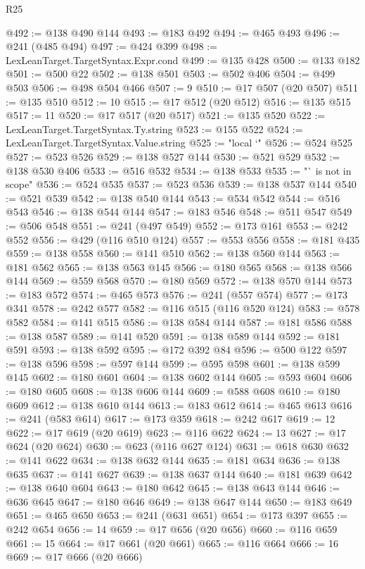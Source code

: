 \begin{lexlean}{R25}
\begin{coremodule}
@492 := @138 @490 @144
@493 := @183 @492
@494 := @465 @493
@496 := @241 (@485 @494)
@497 := @424 @399
@498 := LexLeanTarget.TargetSyntax.Expr.cond
@499 := @135 @428
@500 := @133 @182
@501 := @500 @22
@502 := @138 @501
@503 := @502 @406
@504 := @499 @503
@506 := @498 @504 @466
@507 := 9
@510 := @17 @507 (@20 @507)
@511 := @135 @510
@512 := 10
@515 := @17 @512 (@20 @512)
@516 := @135 @515
@517 := 11
@520 := @17 @517 (@20 @517)
@521 := @135 @520
@522 := LexLeanTarget.TargetSyntax.Ty.string
@523 := @155 @522
@524 := LexLeanTarget.TargetSyntax.Value.string
@525 := "local `"
@526 := @524 @525
@527 := @523 @526
@529 := @138 @527 @144
@530 := @521 @529
@532 := @138 @530 @406
@533 := @516 @532
@534 := @138 @533
@535 := "` is not in scope"
@536 := @524 @535
@537 := @523 @536
@539 := @138 @537 @144
@540 := @521 @539
@542 := @138 @540 @144
@543 := @534 @542
@544 := @516 @543
@546 := @138 @544 @144
@547 := @183 @546
@548 := @511 @547
@549 := @506 @548
@551 := @241 (@497 @549)
@552 := @173 @161
@553 := @242 @552
@556 := @429 (@116 @510 @124)
@557 := @553 @556
@558 := @181 @435
@559 := @138 @558
@560 := @141 @510
@562 := @138 @560 @144
@563 := @181 @562
@565 := @138 @563 @145
@566 := @180 @565
@568 := @138 @566 @144
@569 := @559 @568
@570 := @180 @569
@572 := @138 @570 @144
@573 := @183 @572
@574 := @465 @573
@576 := @241 (@557 @574)
@577 := @173 @341
@578 := @242 @577
@582 := @116 @515 (@116 @520 @124)
@583 := @578 @582
@584 := @141 @515
@586 := @138 @584 @144
@587 := @181 @586
@588 := @138 @587
@589 := @141 @520
@591 := @138 @589 @144
@592 := @181 @591
@593 := @138 @592
@595 := @172 @392 @84
@596 := @500 @122
@597 := @138 @596
@598 := @597 @144
@599 := @595 @598
@601 := @138 @599 @145
@602 := @180 @601
@604 := @138 @602 @144
@605 := @593 @604
@606 := @180 @605
@608 := @138 @606 @144
@609 := @588 @608
@610 := @180 @609
@612 := @138 @610 @144
@613 := @183 @612
@614 := @465 @613
@616 := @241 (@583 @614)
@617 := @173 @359
@618 := @242 @617
@619 := 12
@622 := @17 @619 (@20 @619)
@623 := @116 @622
@624 := 13
@627 := @17 @624 (@20 @624)
@630 := @623 (@116 @627 @124)
@631 := @618 @630
@632 := @141 @622
@634 := @138 @632 @144
@635 := @181 @634
@636 := @138 @635
@637 := @141 @627
@639 := @138 @637 @144
@640 := @181 @639
@642 := @138 @640 @604
@643 := @180 @642
@645 := @138 @643 @144
@646 := @636 @645
@647 := @180 @646
@649 := @138 @647 @144
@650 := @183 @649
@651 := @465 @650
@653 := @241 (@631 @651)
@654 := @173 @397
@655 := @242 @654
@656 := 14
@659 := @17 @656 (@20 @656)
@660 := @116 @659
@661 := 15
@664 := @17 @661 (@20 @661)
@665 := @116 @664
@666 := 16
@669 := @17 @666 (@20 @666)

\end{coremodule}
\end{lexlean}
